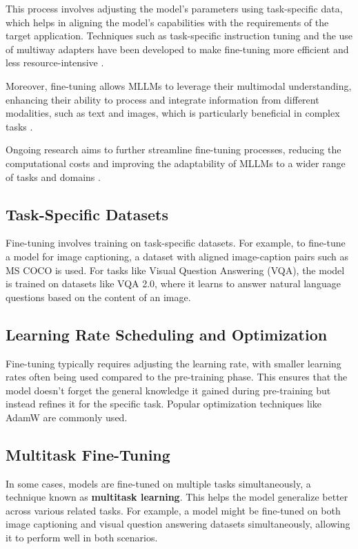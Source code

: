 This process involves adjusting the model's parameters using task-specific data, which helps in aligning the model's capabilities with the requirements of the target application. Techniques such as task-specific instruction tuning and the use of multiway adapters have been developed to make fine-tuning more efficient and less resource-intensive \cite{EfficientMLLMs2024}. 

Moreover, fine-tuning allows MLLMs to leverage their multimodal understanding, enhancing their ability to process and integrate information from different modalities, such as text and images, which is particularly beneficial in complex tasks \cite{MultiwayAdapter2024}.

Ongoing research aims to further streamline fine-tuning processes, reducing the computational costs and improving the adaptability of MLLMs to a wider range of tasks and domains \cite{RobustInstructionTuning2024}.



\subsection{Task-Specific Datasets}

Fine-tuning involves training on task-specific datasets. For example, to fine-tune a model for image captioning, a dataset with aligned image-caption pairs such as MS COCO is used. For tasks like Visual Question Answering (VQA), the model is trained on datasets like VQA 2.0, where it learns to answer natural language questions based on the content of an image.

\subsection{Learning Rate Scheduling and Optimization}

Fine-tuning typically requires adjusting the learning rate, with smaller learning rates often being used compared to the pre-training phase. This ensures that the model doesn’t forget the general knowledge it gained during pre-training but instead refines it for the specific task. Popular optimization techniques like AdamW are commonly used.

\subsection{Multitask Fine-Tuning}

In some cases, models are fine-tuned on multiple tasks simultaneously, a technique known as \textbf{multitask learning}. This helps the model generalize better across various related tasks. For example, a model might be fine-tuned on both image captioning and visual question answering datasets simultaneously, allowing it to perform well in both scenarios.

